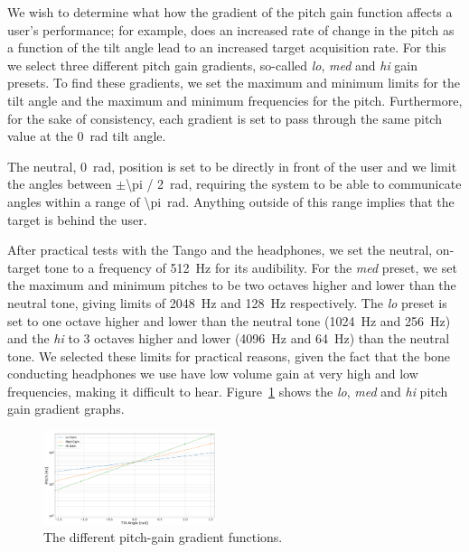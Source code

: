\documentclass[format=sigconf, review=true, screen=true, anonymous=true]{acmart}
\begin{document}
We wish to determine what how the gradient of the pitch gain function affects a user's performance; for example, does an increased rate of change in the pitch as a function of the tilt angle lead to an increased target acquisition rate. For this we select three different pitch gain gradients, so-called \emph{lo}, \emph{med} and \emph{hi} gain presets. To find these gradients, we set the maximum and minimum limits for the tilt angle and the maximum and minimum frequencies for the pitch. Furthermore, for the sake of consistency, each gradient is set to pass through the same pitch value at the \SI{0}{\radian} tilt angle.   

The neutral, \SI{0}{\radian}, position is set to be directly in front of the user and we limit the angles between $\pm$\SI[quotient-mode=fraction]{\pi / 2}{\radian}, requiring the system to be able to communicate angles within a range of \SI{\pi}{\radian}. Anything outside of this range implies that the target is behind the user.

After practical tests with the Tango and the headphones, we set the neutral, on-target tone to a frequency of \SI{512}{\hertz} for its audibility. For the \emph{med} preset, we set the maximum and minimum pitches to be two octaves higher and lower than the neutral tone, giving limits of \SI{2048}{\hertz} and \SI{128}{\hertz} respectively. The \emph{lo} preset is set to one octave higher and lower than the neutral tone (\SI{1024}{\hertz} and \SI{256}{\hertz}) and the \emph{hi} to 3 octaves higher and lower (\SI{4096}{\hertz} and \SI{64}{\hertz}) than the neutral tone. We selected these limits for practical reasons, given the fact that the bone conducting headphones we use have low volume gain at very high and low frequencies, making it difficult to hear. Figure~\ref{fig:pitch-preset-plot} shows the \emph{lo}, \emph{med} and \emph{hi} pitch gain gradient graphs.  

\begin{figure}
  \centering
  \includegraphics[width=0.45\textwidth]{figures/pitch_gradient.pdf}
  \caption{The different pitch-gain gradient functions.}
  \label{fig:pitch-preset-plot}
\end{figure}
\end{document}
